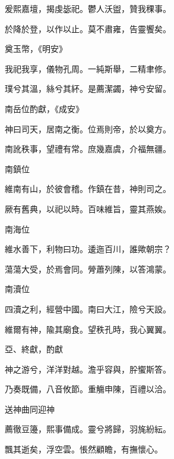 \begin{pinyinscope}
 爰熙嘉壇，揭虔毖祀。鬱人沃盥，贊我稞事。



 於降於登，以作以止。莫不肅雍，告靈饗矣。



 奠玉幣，《明安》



 我祀我享，儀物孔周。一純斯舉，二精聿修。



 璞兮其溫，絲兮其紑。是薦潔蠲，神兮安留。



 南岳位酌獻，《成安》



 神曰司天，居南之衡。位焉則帝，於以奠方。



 南訛秩事，望禮有常。庶幾嘉虞，介福無疆。



 南鎮位



 維南有山，於彼會稽。作鎮在昔，神則司之。



 厥有舊典，以祀以時。百味維旨，靈其燕娭。



 南海位



 維水善下，利物曰功。逶迤百川，誰歟朝宗？



 蕩蕩大受，於焉會同。膋蕭列陳，以答鴻蒙。



 南瀆位



 四瀆之利，經營中國。南曰大江，險兮天設。



 維爾有神，隃其廟食。望秩孔時，我心翼翼。



 亞、終獻，酌獻



 神之游兮，洋洋對越。澹乎容與，肸蠁斯答。



 乃奏既備，八音攸節。重觴申陳，百禮以洽。



 送神曲同迎神



 薦徹豆籩，熙事備成。靈兮將歸，羽旄紛紜。



 飄其逝矣，浮空雲。悵然顧瞻，有撫懷心。




\end{pinyinscope}
